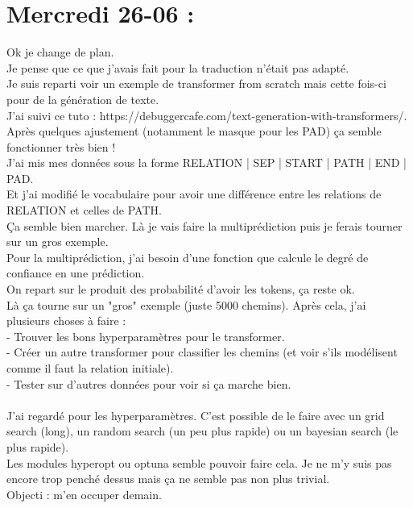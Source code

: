 \documentclass{article}
\begin{document}
\section*{Mercredi 26-06 :}
Ok je change de plan.\\
Je pense que ce que j'avais fait pour la traduction n'était pas adapté.\\
Je suis reparti voir un exemple de transformer from scratch mais cette fois-ci pour de la génération de texte.\\
J'ai suivi ce tuto : https://debuggercafe.com/text-generation-with-transformers/.\\
Après quelques ajustement (notamment le masque pour les PAD) ça semble fonctionner très bien !\\
J'ai mis mes données sous la forme RELATION | SEP | START | PATH | END | PAD.\\
Et j'ai modifié le vocabulaire pour avoir une différence entre les relations de RELATION et celles de PATH.\\
Ça semble bien marcher. Là je vais faire la multiprédiction puis je ferais tourner sur un gros exemple.\\
Pour la multiprédiction, j'ai besoin d'une fonction que calcule le degré de confiance en une prédiction.\\
On repart sur le produit des probabilité d'avoir les tokens, ça reste ok.\\
Là ça tourne sur un "gros" exemple (juste 5000 chemins). Après cela, j'ai plusieurs choses à faire :\\
- Trouver les bons hyperparamètres pour le transformer.\\
- Créer un autre transformer pour classifier les chemins (et voir s'ils modélisent comme il faut la relation initiale).\\
- Tester sur d'autres données pour voir si ça marche bien.\\\\
J'ai regardé pour les hyperparamètres. C'est possible de le faire avec un grid search (long), un random search (un peu plus rapide) ou un bayesian search (le plus rapide).\\
Les modules hyperopt ou optuna semble pouvoir faire cela. Je ne m'y suis pas encore trop penché dessus mais ça ne semble pas non plus trivial.\\
Objecti : m'en occuper demain.\\
\end{document}
